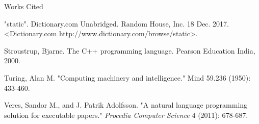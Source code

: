 \documentclass[12pt]{article}
\newcommand{\bibent}{\noindent \hangindent 40pt}
\newenvironment{workscited}{\newpage \begin{center} Works Cited \end{center}}{\newpage }
\begin{document}
\begin{flushleft}
\begin{workscited}
\bibent
"static". Dictionary.com Unabridged. Random House, Inc. 18 Dec. 2017. <Dictionary.com http://www.dictionary.com/browse/static>.

\bibent
Stroustrup, Bjarne. The C++ programming language. Pearson Education India, 2000.

\bibent
Turing, Alan M. "Computing machinery and intelligence." Mind 59.236 (1950): 433-460.

\bibent
Veres, Sandor M., and J. Patrik Adolfsson. "A natural language programming solution for executable papers." \textit{Procedia Computer Science} 4 (2011): 678-687.

\end{workscited}

\end{flushleft}
\end{document}
